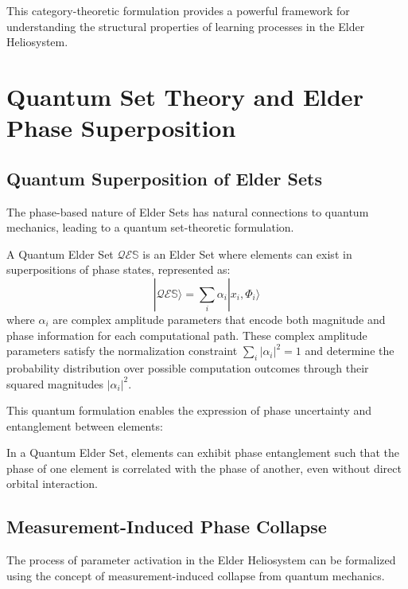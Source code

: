 \begin{theorem}
\begin{definition}
\begin{definition}
\begin{enumerate}
This category-theoretic formulation provides a powerful framework for understanding the structural properties of learning processes in the Elder Heliosystem.

\section{Quantum Set Theory and Elder Phase Superposition}

\subsection{Quantum Superposition of Elder Sets}

The phase-based nature of Elder Sets has natural connections to quantum mechanics, leading to a quantum set-theoretic formulation.

\begin{definition}
A Quantum Elder Set $\mathcal{Q}\mathcal{E}\mathbb{S}$ is an Elder Set where elements can exist in superpositions of phase states, represented as:
\begin{equation}
|\mathcal{Q}\mathcal{E}\mathbb{S}\rangle = \sum_i \alpha_i |x_i, \Phi_i\rangle
\end{equation}
where $\alpha_i$ are complex amplitude parameters that encode both magnitude and phase information for each computational path. These complex amplitude parameters satisfy the normalization constraint $\sum_i |\alpha_i|^2 = 1$ and determine the probability distribution over possible computation outcomes through their squared magnitudes $|\alpha_i|^2$.
\end{definition}

This quantum formulation enables the expression of phase uncertainty and entanglement between elements:

\begin{theorem}
In a Quantum Elder Set, elements can exhibit phase entanglement such that the phase of one element is correlated with the phase of another, even without direct orbital interaction.
\end{theorem}

\subsection{Measurement-Induced Phase Collapse}

The process of parameter activation in the Elder Heliosystem can be formalized using the concept of measurement-induced collapse from quantum mechanics.


\end{enumerate}
\end{definition}
\end{definition}
\end{theorem}
